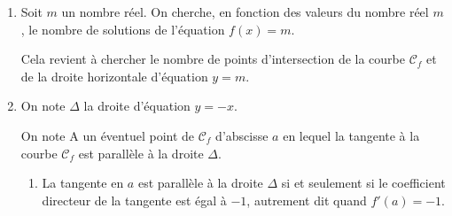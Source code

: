 \documentclass[10pt]{article}
\providecommand{\e}{{\mathrm{e}}}
\begin{document}
\begin{enumerate}
$f(1)=\dfrac{\e^{1}}{1}=\e$

On établit le tableau de variations de la fonction $f$:

\begin{center}
{\renewcommand{\arraystretch}{1.3}
\def\esp{\hspace*{1.5cm}}
\def\hauteur{0pt}
$\begin{array}{|c| l *3{c} c|}
\hline
 x & 0 & \esp & 1 & \esp & +\infty \\
\hline
f'(x) &  \vline\;\vline\;  &  \pmb{-} & \vline\hspace{-2.7pt}0 & \pmb{+} & \\  
\hline
  & \vline\;\vline\;  \Rnode{max1}{+\infty}  &  &  &  & \Rnode{max2}{+\infty}   \\
f(x) & \vline\;\vline\;  &  & & &  \rule{0pt}{\hauteur} \\
 &  \vline\;\vline\;  & &   \Rnode{min}{\e} & & \rule{0pt}{\hauteur}
\ncline{->}{max1}{min} \ncline{->}{min}{max2}\\
\hline
\end{array}$
}
\end{center}		
 
\item Soit $m$ un nombre réel. On cherche, en fonction des valeurs du nombre réel $m$, le nombre de solutions de l'équation $f(x) = m$.

Cela revient à chercher le nombre de points d'intersection de la courbe $\mathcal{C}_f$ et de la droite horizontale d'équation $y=m$.


\item  On note $\Delta$ la droite d'équation $y = -x$.

On note A un éventuel point de $\mathcal{C}_f$ d'abscisse $a$ en lequel la tangente à la courbe $\mathcal{C}_f$ est parallèle à la droite $\Delta$.
	\begin{enumerate}
		\item 
La tangente en $a$ est parallèle à la droite $\Delta$ si et seulement si le coefficient directeur de la tangente est égal à $-1$, autrement dit quand $f'(a)=-1$.


\end{enumerate}
\end{enumerate}
\end{document}

